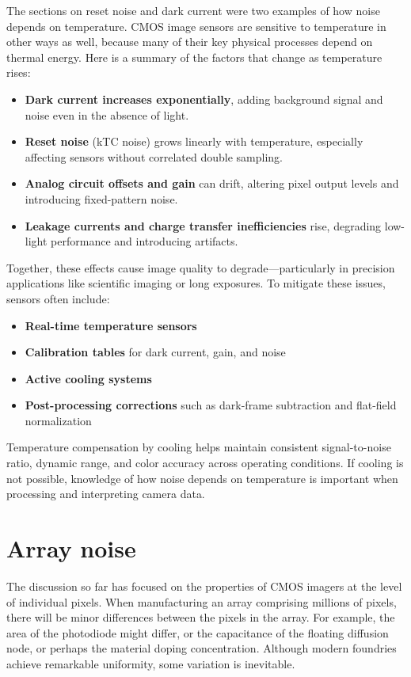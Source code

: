 \documentclass[
  letterpaper,
]{book}
\providecommand{\tightlist}{%
  \setlength{\itemsep}{0pt}\setlength{\parskip}{0pt}}\usepackage{longtable,booktabs,array}
\begin{document}
The sections on reset noise and dark current were two examples of how
noise depends on temperature. CMOS image sensors are sensitive to
temperature in other ways as well, because many of their key physical
processes depend on thermal energy. Here is a summary of the factors
that change as temperature rises:

\begin{itemize}
\tightlist
\item
  \textbf{Dark current increases exponentially}, adding background
  signal and noise even in the absence of light.
\item
  \textbf{Reset noise} (kTC noise) grows linearly with temperature,
  especially affecting sensors without correlated double sampling.
\item
  \textbf{Analog circuit offsets and gain} can drift, altering pixel
  output levels and introducing fixed-pattern noise.
\item
  \textbf{Leakage currents and charge transfer inefficiencies} rise,
  degrading low-light performance and introducing artifacts.
\end{itemize}

Together, these effects cause image quality to degrade---particularly in
precision applications like scientific imaging or long exposures. To
mitigate these issues, sensors often include:

\begin{itemize}
\tightlist
\item
  \textbf{Real-time temperature sensors}
\item
  \textbf{Calibration tables} for dark current, gain, and noise
\item
  \textbf{Active cooling systems}
\item
  \textbf{Post-processing corrections} such as dark-frame subtraction
  and flat-field normalization
\end{itemize}

Temperature compensation by cooling helps maintain consistent
signal-to-noise ratio, dynamic range, and color accuracy across
operating conditions. If cooling is not possible, knowledge of how noise
depends on temperature is important when processing and interpreting
camera data.

\section{Array noise}\label{sec-array-noise}

The discussion so far has focused on the properties of CMOS imagers at
the level of individual pixels. When manufacturing an array comprising
millions of pixels, there will be minor differences between the pixels
in the array. For example, the area of the photodiode might differ, or
the capacitance of the floating diffusion node, or perhaps the material
doping concentration. Although modern foundries achieve remarkable
uniformity, some variation is inevitable.
\end{document}
